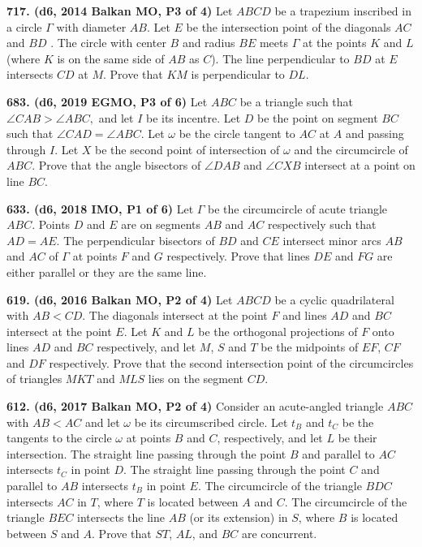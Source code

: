 \documentclass{article}
\begin{document}
\textbf{717. (\color{red}d6\color{black}, 2014 Balkan MO, P3 of 4)} Let $ABCD$ be a trapezium inscribed in a circle $\Gamma$ with diameter $AB$. Let $E$ be the intersection point of the diagonals $AC$ and $BD$ . The circle with center $B$ and radius $BE$ meets $\Gamma$ at the points $K$ and $L$ (where $K$ is on the same side of $AB$ as $C$). The line perpendicular to $BD$ at $E$ intersects $CD$ at $M$. Prove that $KM$ is perpendicular to $DL$.

\textbf{683. (\color{red}d6\color{black}, 2019 EGMO, P3 of 6)} Let $A B C$ be a triangle such that $\angle C A B>\angle A B C,$ and let $I$ be its incentre. Let $D$ be the point on segment $B C$ such that $\angle C A D=\angle A B C .$ Let $\omega$ be the circle tangent to $A C$ at $A$ and passing through $I$. Let $X$ be the second point of intersection of $\omega$ and the circumcircle of $A B C$. Prove that the angle bisectors of $\angle D A B$ and $\angle C X B$ intersect at a point on line $B C .$

\textbf{633. (\color{red}d6\color{black}, 2018 IMO, P1 of 6)} Let $\Gamma$ be the circumcircle of acute triangle $ABC$. Points $D$ and $E$ are on segments $AB$ and $AC$ respectively such that $AD = AE$. The perpendicular bisectors of $BD$ and $CE$ intersect minor arcs $AB$ and $AC$ of $\Gamma$ at points $F$ and $G$ respectively. Prove that lines $DE$ and $FG$ are either parallel or they are the same line.

\textbf{619. (\color{red}d6\color{black}, 2016 Balkan MO, P2 of 4)} Let $ABCD$ be a cyclic quadrilateral with $AB<CD$. The diagonals intersect at the point $F$ and lines $AD$ and $BC$ intersect at the point $E$. Let $K$ and $L$ be the orthogonal projections of $F$ onto lines $AD$ and $BC$ respectively, and let $M$, $S$ and $T$ be the midpoints of $EF$, $CF$ and $DF$ respectively. Prove that the second intersection point of the circumcircles of triangles $MKT$ and $MLS$ lies on the segment $CD$.

\textbf{612. (\color{red}d6\color{black}, 2017 Balkan MO, P2 of 4)} Consider an acute-angled triangle $ABC$ with $AB<AC$ and let $\omega$ be its circumscribed circle. Let $t_B$ and $t_C$ be the tangents to the circle $\omega$ at points $B$ and $C$, respectively, and let $L$ be their intersection. The straight line passing through the point $B$ and parallel to $AC$ intersects $t_C$ in point $D$. The straight line passing through the point $C$ and parallel to $AB$ intersects $t_B$ in point $E$. The circumcircle of the triangle $BDC$ intersects $AC$ in $T$, where $T$ is located between $A$ and $C$. The circumcircle of the triangle $BEC$ intersects the line $AB$ (or its extension) in $S$, where $B$ is located between $S$ and $A$. Prove that $ST$, $AL$, and $BC$ are concurrent.
\end{document}
